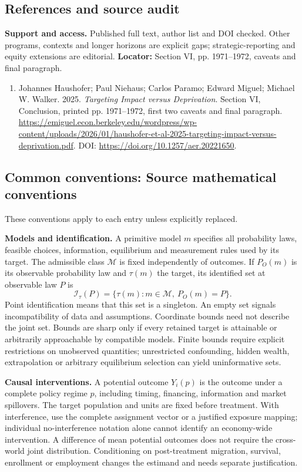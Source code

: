 \documentclass[11pt,a4paper]{article}
\begin{document}
\subsection*{References and source audit}
\textbf{Support and access.} Published full text, author list and DOI checked. Other programs, contexts and longer horizons are explicit gaps; strategic-reporting and equity extensions are editorial. \textbf{Locator:} Section VI, pp. 1971--1972, caveats and final paragraph.
\begin{enumerate}\raggedright
\item\hypertarget{definitions:source:30007656:1}{} Johannes Haushofer; Paul Niehaus; Carlos Paramo; Edward Miguel; Michael W. Walker. 2025. \emph{Targeting Impact versus Deprivation}. Section VI, Conclusion, printed pp. 1971–1972, first two caveats and final paragraph.
\url{https://emiguel.econ.berkeley.edu/wordpress/wp-content/uploads/2026/01/haushofer-et-al-2025-targeting-impact-versus-deprivation.pdf}.
DOI: \url{https://doi.org/10.1257/aer.20221650}.
\end{enumerate}

\subsection*{Common conventions: Source mathematical conventions}

These conventions apply to each entry unless explicitly replaced.

\textbf{Models and identification.} A primitive model \(m\) specifies all probability laws, feasible choices, information, equilibrium and measurement rules used by its target. The admissible class \(\mathcal M\) is fixed independently of outcomes. If \(P_O(m)\) is its observable probability law and \(\tau(m)\) the target, its identified set at observable law \(P\) is
\[
 \mathcal I_\tau(P)=\{\tau(m):m\in\mathcal M,\ P_O(m)=P\}.
\]
Point identification means that this set is a singleton. An empty set signals incompatibility of data and assumptions. Coordinate bounds need not describe the joint set. Bounds are sharp only if every retained target is attainable or arbitrarily approachable by compatible models. Finite bounds require explicit restrictions on unobserved quantities; unrestricted confounding, hidden wealth, extrapolation or arbitrary equilibrium selection can yield uninformative sets.

\textbf{Causal interventions.} A potential outcome \(Y_i(p)\) is the outcome under a complete policy regime \(p\), including timing, financing, information and market spillovers. The target population and units are fixed before treatment. With interference, use the complete assignment vector or a justified exposure mapping; individual no-interference notation alone cannot identify an economy-wide intervention. A difference of mean potential outcomes does not require the cross-world joint distribution. Conditioning on post-treatment migration, survival, enrollment or employment changes the estimand and needs separate justification.
\end{document}
